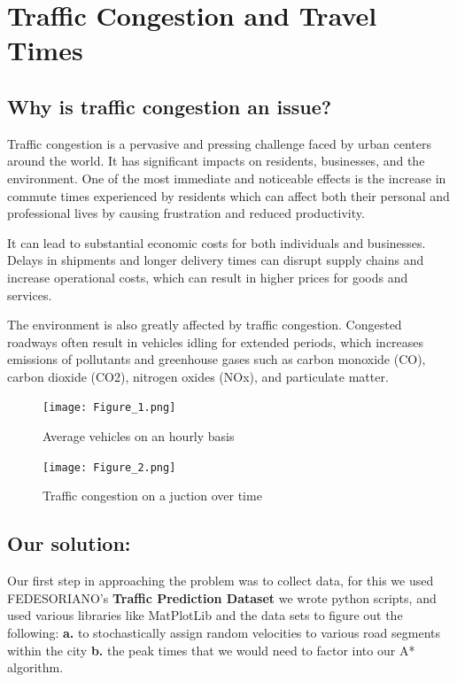 \documentclass{article}
\begin{document}
\section{Traffic Congestion and Travel Times}


\subsection {Why is traffic congestion an issue?}


Traffic congestion is a pervasive and pressing challenge faced by urban centers around the world. It has significant impacts on residents, businesses, and the environment. One of the most immediate and noticeable effects is the increase in commute times experienced by residents which can affect both their personal and professional lives by causing frustration and reduced productivity. 

It can lead to substantial economic costs for both individuals and businesses. Delays in shipments and longer delivery times can disrupt supply chains and increase operational costs, which can result in higher prices for goods and services.

The environment is also greatly affected by traffic congestion. Congested roadways often result in vehicles idling for extended periods, which increases emissions of pollutants and greenhouse gases such as carbon monoxide (CO), carbon dioxide (CO2), nitrogen oxides (NOx), and particulate matter. 

\begin{figure}[h]
    \centering
    \texttt{[image: Figure\_1.png]}
    \caption{Average vehicles on an hourly basis}

    \texttt{[image: Figure\_2.png]}
    \caption{Traffic congestion on a juction over time}

\end{figure}
\subsection{Our solution: }

Our first step in approaching the problem was to collect data, for this we used FEDESORIANO's  \textbf{{Traffic Prediction Dataset}} we wrote python scripts, and used various libraries like MatPlotLib and the data sets to  figure out the following: 
\textbf{{a.}}  to stochastically  assign random velocities to various road segments within the city \textbf{{b.}} the peak times that we would need to factor into our A* algorithm. 
\end{document}
